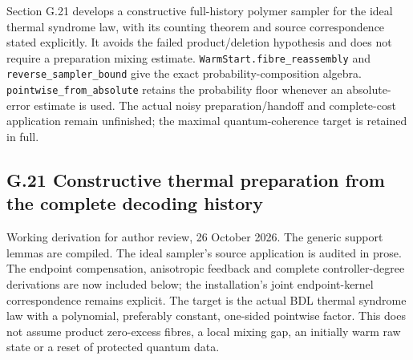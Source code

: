 \documentclass[
]{article}
\begin{document}
Section G.21 develops a constructive full-history polymer sampler for
the ideal thermal syndrome law, with its counting theorem and source
correspondence stated explicitly. It avoids the failed
p\allowbreak{}r\allowbreak{}o\allowbreak{}d\allowbreak{}u\allowbreak{}c\allowbreak{}t\allowbreak{}/\allowbreak{}d\allowbreak{}e\allowbreak{}l\allowbreak{}e\allowbreak{}t\allowbreak{}i\allowbreak{}o\allowbreak{}n
hypothesis and does not require a preparation mixing estimate.
\texttt{W\allowbreak{}a\allowbreak{}r\allowbreak{}m\allowbreak{}S\allowbreak{}t\allowbreak{}a\allowbreak{}r\allowbreak{}t\allowbreak{}.\allowbreak{}f\allowbreak{}i\allowbreak{}b\allowbreak{}r\allowbreak{}e\allowbreak{}\_\allowbreak{}r\allowbreak{}e\allowbreak{}a\allowbreak{}s\allowbreak{}s\allowbreak{}e\allowbreak{}m\allowbreak{}b\allowbreak{}l\allowbreak{}y}
and
\texttt{r\allowbreak{}e\allowbreak{}v\allowbreak{}e\allowbreak{}r\allowbreak{}s\allowbreak{}e\allowbreak{}\_\allowbreak{}s\allowbreak{}a\allowbreak{}m\allowbreak{}p\allowbreak{}l\allowbreak{}e\allowbreak{}r\allowbreak{}\_\allowbreak{}b\allowbreak{}o\allowbreak{}u\allowbreak{}n\allowbreak{}d}
give the exact probability-composition algebra.
\texttt{p\allowbreak{}o\allowbreak{}i\allowbreak{}n\allowbreak{}t\allowbreak{}w\allowbreak{}i\allowbreak{}s\allowbreak{}e\allowbreak{}\_\allowbreak{}f\allowbreak{}r\allowbreak{}o\allowbreak{}m\allowbreak{}\_\allowbreak{}a\allowbreak{}b\allowbreak{}s\allowbreak{}o\allowbreak{}l\allowbreak{}u\allowbreak{}t\allowbreak{}e}
retains the probability floor whenever an absolute-error estimate is
used. The actual noisy
p\allowbreak{}r\allowbreak{}e\allowbreak{}p\allowbreak{}a\allowbreak{}r\allowbreak{}a\allowbreak{}t\allowbreak{}i\allowbreak{}o\allowbreak{}n\allowbreak{}/\allowbreak{}h\allowbreak{}a\allowbreak{}n\allowbreak{}d\allowbreak{}o\allowbreak{}f\allowbreak{}f
and complete-cost application remain unfinished; the maximal
quantum-coherence target is retained in full.

\subsection{G.21 Constructive thermal preparation from the complete
decoding
history}\label{g.21-constructive-thermal-preparation-from-the-complete-decoding-history}

Working derivation for author review, 26 October 2026. The generic
support lemmas are compiled. The ideal sampler's source application is
audited in prose. The endpoint compensation, anisotropic feedback and
complete controller-degree derivations are now included below; the
installation's joint endpoint-kernel correspondence remains explicit.
The target is the actual BDL thermal syndrome law with a polynomial,
preferably constant, one-sided pointwise factor. This does not assume
product zero-excess fibres, a local mixing gap, an initially warm raw
state or a reset of protected quantum data.
\end{document}

